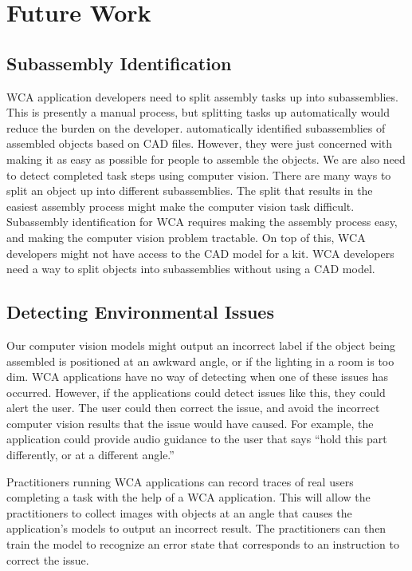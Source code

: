 \section{Future Work}

\subsection{Subassembly Identification}

WCA application developers need to split assembly tasks up into subassemblies.
This is presently a manual process, but splitting tasks up automatically would
reduce the burden on the developer.
\citet{subassembly_identification} automatically identified subassemblies of
assembled objects based on CAD files.
However, they were just concerned with making it as easy as possible for people
to assemble the objects.
We are also need to detect completed task steps using computer vision.
There are many ways to split an object up into different subassemblies.
The split that results in the easiest assembly process might make the computer
vision task difficult.
Subassembly identification for WCA requires making the assembly process easy,
and making the computer vision problem tractable.
On top of this, WCA developers might not have access to the CAD model for a kit.
WCA developers need a way to split objects into subassemblies without using
a CAD model.

\subsection{Detecting Environmental Issues}

Our computer vision models might output an incorrect label if the object being
assembled is positioned at an awkward angle, or if the lighting in a room is
too dim.
WCA applications have no way of detecting when one of these issues has
occurred.
However, if the applications could detect issues like this, they could alert the
user.
The user could then correct the issue, and avoid the incorrect computer vision
results that the issue would have caused.
For example, the application could provide audio guidance to the user that
says ``hold this part differently, or at a different angle.''

Practitioners running WCA applications can record traces of real users
completing a task with the help of a WCA application.
This will allow the practitioners to collect images with objects at an angle
that causes the application's models to output an incorrect result.
The practitioners can then train the model to recognize an error state that
corresponds to an instruction to correct the issue.

